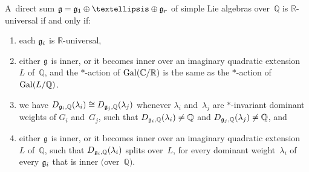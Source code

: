 \begin{prop}
A~direct sum $\Lie G = \Lie G_1 \oplus \dots \oplus \Lie G_r$ of simple Lie algebras over~$\mathbb{Q}$ is
$\mathbb{R}$-universal if and only if:
\renewcommand{\labelenumi}{{\rm (\theenumi)}}
\begin{enumerate}\itemsep=0pt
\item
\label{SS-Gi}
each $\Lie G_i$ is $\mathbb{R}$-universal,
\item
\label{SS-star}
either $\Lie G$ is inner, or it becomes inner over an imaginary quadratic extension~$L$ of~$\mathbb{Q}$, and the
$*$-action of $\operatorname{Gal}(\mathbb{C}/\mathbb{R})$ is the same as the $*$-action of $\operatorname{Gal}(L/\mathbb{Q})$.
\item
\label{SS-Di=Dj}
we have $D_{\Lie G_i, \mathbb{Q}}(\lambda_i) \cong D_{\Lie G_j, \mathbb{Q}}(\lambda_j)$ whenever $\lambda_i$
and~$\lambda_j$ are $*$-invariant dominant weights of $G_i$ and~$G_j$, such that $D_{\Lie G_i, \mathbb{Q}}(\lambda_i)
\neq \mathbb{Q}$ and $D_{\Lie G_j, \mathbb{Q}}(\lambda_j) \neq \mathbb{Q}$, and
\item
\label{SS-Dsplit}
either $\Lie G$ is inner, or it becomes inner over an imaginary quadratic extension~$L$ of~$\mathbb{Q}$, such that
$D_{\Lie G_i, \mathbb{Q}}(\lambda_i)$ splits over~$L$, for every dominant weight~$\lambda_i$ of every $\Lie G_i$ that is
inner $($over~$\mathbb{Q})$.
\end{enumerate}
\end{prop}

